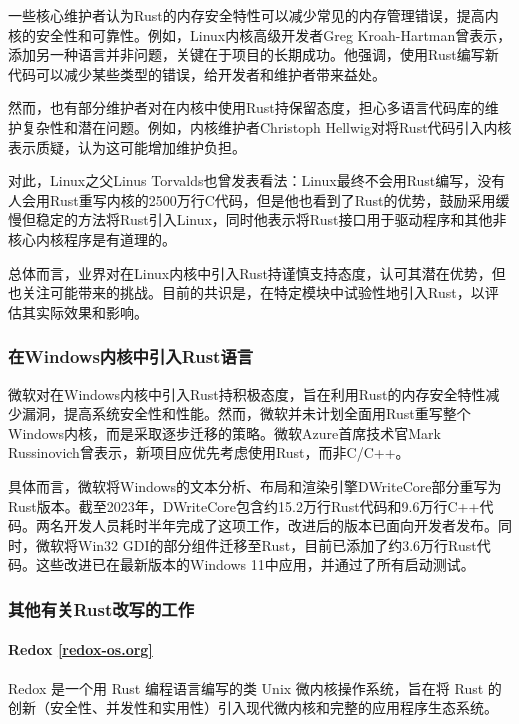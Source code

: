 一些核心维护者认为Rust的内存安全特性可以减少常见的内存管理错误，提高内核的安全性和可靠性。例如，Linux内核高级开发者Greg Kroah-Hartman曾表示，添加另一种语言并非问题，关键在于项目的长期成功。他强调，使用Rust编写新代码可以减少某些类型的错误，给开发者和维护者带来益处。

然而，也有部分维护者对在内核中使用Rust持保留态度，担心多语言代码库的维护复杂性和潜在问题。例如，内核维护者Christoph Hellwig对将Rust代码引入内核表示质疑，认为这可能增加维护负担。

对此，Linux之父Linus Torvalds也曾发表看法：Linux最终不会用Rust编写，没有人会用Rust重写内核的2500万行C代码，但是他也看到了Rust的优势，鼓励采用缓慢但稳定的方法将Rust引入Linux，同时他表示将Rust接口用于驱动程序和其他非核心内核程序是有道理的。

总体而言，业界对在Linux内核中引入Rust持谨慎支持态度，认可其潜在优势，但也关注可能带来的挑战。目前的共识是，在特定模块中试验性地引入Rust，以评估其实际效果和影响。

\subsubsection{在Windows内核中引入Rust语言}

微软对在Windows内核中引入Rust持积极态度，旨在利用Rust的内存安全特性减少漏洞，提高系统安全性和性能。然而，微软并未计划全面用Rust重写整个Windows内核，而是采取逐步迁移的策略。微软Azure首席技术官Mark Russinovich曾表示，新项目应优先考虑使用Rust，而非C/C++。

具体而言，微软将Windows的文本分析、布局和渲染引擎DWriteCore部分重写为Rust版本。截至2023年，DWriteCore包含约15.2万行Rust代码和9.6万行C++代码。两名开发人员耗时半年完成了这项工作，改进后的版本已面向开发者发布。同时，微软将Win32 GDI的部分组件迁移至Rust，目前已添加了约3.6万行Rust代码。这些改进已在最新版本的Windows 11中应用，并通过了所有启动测试。

\subsubsection{其他有关Rust改写的工作}

\paragraph{Redox \href{https://www.redox-os.org/zh/?utm_source=chatgpt.com}{[redox-os.org]}}

Redox 是一个用 Rust 编程语言编写的类 Unix 微内核操作系统，旨在将 Rust 的创新（安全性、并发性和实用性）引入现代微内核和完整的应用程序生态系统。

